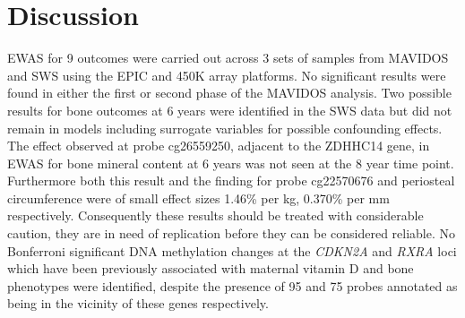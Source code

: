 \documentclass[
]{book}
\begin{document}
\hypertarget{discussion}{%
\section{Discussion}\label{discussion}}

EWAS for 9 outcomes were carried out across 3 sets of samples from MAVIDOS and SWS using the EPIC and 450K array platforms.
No significant results were found in either the first or second phase of the MAVIDOS analysis.
Two possible results for bone outcomes at 6 years were identified in the SWS data but did not remain in models including surrogate variables for possible confounding effects.
The effect observed at probe cg26559250, adjacent to the ZDHHC14 gene, in EWAS for bone mineral content at 6 years was not seen at the 8 year time point.
Furthermore both this result and the finding for probe cg22570676 and periosteal circumference were of small effect sizes 1.46\% per kg, 0.370\% per mm respectively.
Consequently these results should be treated with considerable caution, they are in need of replication before they can be considered reliable.
No Bonferroni significant DNA methylation changes at the \emph{CDKN2A} and \emph{RXRA} loci which have been previously associated with maternal vitamin D and bone phenotypes were identified, despite the presence of 95 and 75 probes annotated as being in the vicinity of these genes respectively.
\end{document}
